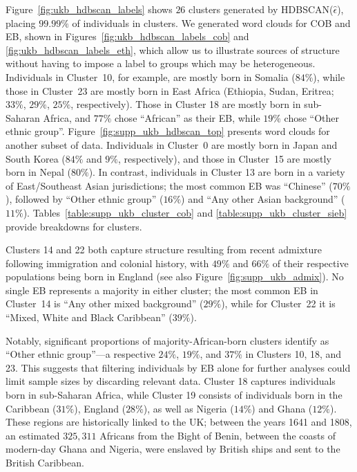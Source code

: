 \clearpage

Figure~\ref{fig:ukb_hdbscan_labels} shows $26$ clusters generated by HDBSCAN($\hat{\epsilon}$), placing $99.99\%$ of individuals in clusters. We generated word clouds for COB and EB, shown in Figures~\ref{fig:ukb_hdbscan_labels_cob} and \ref{fig:ukb_hdbscan_labels_eth}, which allow us to illustrate sources of structure without having to impose a label to groups which may be heterogeneous. Individuals in Cluster~10, for example, are mostly born in Somalia ($84\%$), while those in Cluster~23 are mostly born in East Africa (Ethiopia, Sudan, Eritrea; $33\%$, $29\%$, $25\%$, respectively). Those in Cluster 18 are mostly born in sub-Saharan Africa, and $77\%$ chose ``African'' as their EB, while $19\%$ chose ``Other ethnic group''. Figure~\ref{fig:supp_ukb_hdbscan_top} presents word clouds for another subset of data. Individuals in Cluster~0 are mostly born in Japan and South Korea ($84\%$ and $9\%$, respectively), and those in Cluster~15 are mostly born in Nepal ($80\%$). In contrast, individuals in Cluster 13 are born in a variety of East/Southeast Asian jurisdictions; the most common EB was ``Chinese'' ($70\%$), followed by ``Other ethnic group'' ($16\%$) and ``Any other Asian background'' ($11\%$). Tables~\ref{table:supp_ukb_cluster_cob} and \ref{table:supp_ukb_cluster_sieb} provide breakdowns for clusters.

Clusters 14 and 22 both capture structure resulting from recent admixture following immigration and colonial history, with $49\%$ and $66\%$ of their respective populations being born in England (see also Figure~\ref{fig:supp_ukb_admix}). No single EB represents a majority in either cluster; the most common EB in Cluster~14 is ``Any other mixed background'' ($29\%$), while for Cluster~22 it is ``Mixed, White and Black Caribbean'' ($39\%$). 

Notably, significant proportions of majority-African-born clusters identify as ``Other ethnic group''---a respective $24\%$, $19\%$, and $37\%$ in Clusters 10, 18, and 23. This suggests that filtering individuals by EB alone for further analyses could limit sample sizes by discarding relevant data. Cluster 18 captures individuals born in sub-Saharan Africa, while Cluster 19 consists of individuals born in the Caribbean ($31\%$), England ($28\%$), as well as Nigeria ($14\%$) and Ghana ($12\%$). These regions are historically linked to the UK; between the years 1641 and 1808, an estimated $325,311$ Africans from the Bight of Benin, between the coasts of modern-day Ghana and Nigeria, were enslaved by British ships and sent to the British Caribbean\citep{slavevoyages,fortes-lima_anthropological_2021}.

